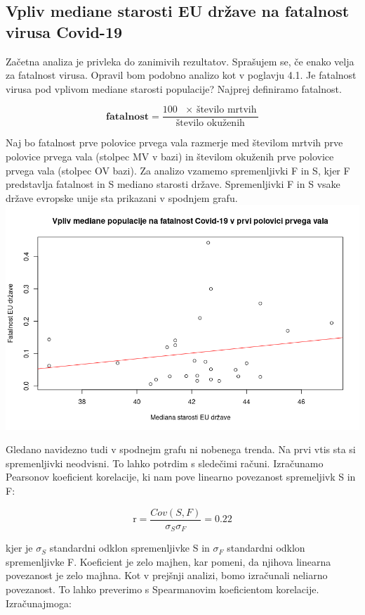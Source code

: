 \documentclass[a4paper,11pt]{article}
\begin{document}
\subsection{Vpliv mediane starosti EU države na fatalnost virusa Covid-19}
Začetna analiza je privleka do zanimivih rezultatov. Sprašujem se, če enako velja za fatalnost virusa. Opravil bom podobno analizo kot v poglavju 4.1. Je fatalnost virusa pod vplivom mediane starosti populacije? Najprej definiramo fatalnost.
\begin{center}
\[\textbf{fatalnost} = \frac{100 \text{ \(\times\) število mrtvih}}{\text{število okuženih}}\]
\end{center} 
Naj bo fatalnost prve polovice prvega vala razmerje med številom mrtvih prve polovice prvega vala (stolpec MV v bazi) in številom okuženih prve polovice prvega vala (stolpec OV bazi). Za analizo vzamemo spremenljivki F in S, kjer F predstavlja fatalnost in S mediano starosti države. Spremenljivki F in S vsake države evropske unije sta prikazani v spodnjem grafu.
\includegraphics[scale=0.6]{Vpliv_mediane_populacije_na_fatalnost_Covid-19_v_prvi_polovici_vala}

Gledano navidezno tudi v spodnejm grafu ni nobenega trenda. Na prvi vtis sta si spremenljivki neodvisni. To lahko potrdim s sledečimi računi. Izračunamo Pearsonov koeficient korelacije, ki nam pove linearno povezanost spremeljivk S in F:

\begin{center}
\[\text{r} = \frac{Cov(S,F)}{\sigma_{S} \sigma_{F}} = 0.22\]
\end{center} 
kjer je \(\sigma_{S}\) standardni odklon spremenljivke S in \(\sigma_{F}\) standardni odklon spremenljivke F. Koeficient je zelo majhen, kar pomeni, da njihova linearna povezanost je zelo majhna. Kot v prejšnji analizi, bomo izračunali neliarno povezanost. To lahko preverimo s Spearmanovim koeficientom korelacije. Izračunajmoga: 
\end{document}
